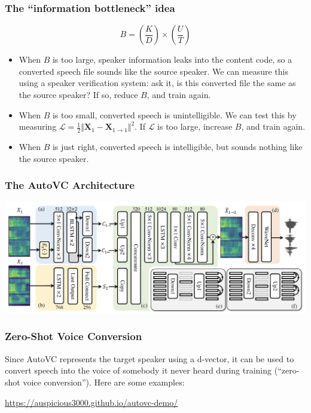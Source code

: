 \documentclass{beamer}
\begin{document}
\begin{frame}
  \frametitle{The ``information bottleneck'' idea}

  \begin{displaymath}
    B = \left(\frac{K}{D}\right)\times\left(\frac{U}{T}\right)
  \end{displaymath}
  \begin{itemize}
  \item When $B$ is too large, speaker information leaks into the
    content code, so a converted speech file sounds like the source
    speaker.  We can measure this using a speaker verification system:
    ask it, is this converted file the same as the source speaker?  If
    so, reduce $B$, and train again.
  \item When $B$ is too small, converted speech is unintelligible.  We
    can test this by measuring
    $\mathcal{L}=\frac{1}{2}\Vert\bm{X}_1-\bm{X}_{1\rightarrow{1}}\Vert^2$.
    If $\mathcal{L}$ is too large, increase $B$, and train again.
  \item When $B$ is just right, converted speech is intelligible, but
    sounds nothing like the source speaker.
  \end{itemize}
\end{frame}

\begin{frame}
  \frametitle{The AutoVC Architecture}

  \centerline{\includegraphics[width=\textwidth]{figs/qianfig3.png}}
\end{frame}

\begin{frame}
  \frametitle{Zero-Shot Voice Conversion}

  Since AutoVC represents the target speaker using a d-vector, it can
  be used to convert speech into the voice of somebody it never heard
  during training (``zero-shot voice conversion'').  Here are some
  examples:

  \centerline{\url{https://auspicious3000.github.io/autovc-demo/}}

\end{frame}
\end{document}
